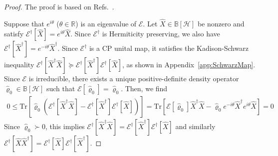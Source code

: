 \documentclass[preprint,pteplogo]{ptephy_v2}%
\numberwithin{equation}{section}
\theoremstyle{definition}
\newcommand{\mc}[1]{\mathcal{#1}}
\newcommand{\mr}[1]{\mathrm{#1}}
\newcommand{\mbb}[1]{\mathbb{#1}}
\newcommand{\Tr}{\mr{Tr}}
\begin{document}
\begin{proof}
The proof is based on Refs.~\cite{fagnola2009irreducible, wolf2012quantum}.

Suppose that $e^{i\theta}$ ($\theta \in \mbb{R}$) is an eigenvalue of $\mc{E}$.
Let $\hat{X} \in \mbb{B}[\mc{H}]$ be nonzero and satisfy $\mc{E}^\dagger[\hat{X}] = e^{i\theta} \hat{X}$. 
Since $\mc{E}^\dagger$ is Hermiticity preserving, we also have $\mc{E}^\dagger[\hat{X}^\dagger] = e^{-i\theta} \hat{X}^\dagger$.
Since $\mc{E}^\dagger$ is a CP unital map, it satisfies the Kadison-Schwarz inequality $\mc{E}^\dagger[\hat{X}^\dagger \hat{X}] \succeq \mc{E}^\dagger[\hat{X}^\dagger] \mc{E}^\dagger[\hat{X}]$, as shown in Appendix~\ref{app:SchwarzMap}.
Since $\mc{E}$ is irreducible, there exists a unique positive-definite density operator $\hat{\varrho}_0 \in \mbb{B}[\mc{H}]$ such that $\mc{E}[\hat{\varrho}_0] = \hat{\varrho}_0$.
Then, we find
\begin{align}
0 
\leq \Tr [\hat{\varrho}_0 (\mc{E}^\dagger[\hat{X}^\dagger \hat{X}] - \mc{E}^\dagger[\hat{X}^\dagger] \mc{E}^\dagger[\hat{X}])]
= \Tr [\mc{E}[\hat{\varrho}_0] \hat{X}^\dagger \hat{X} -\hat{\varrho}_0 e^{-i\theta} \hat{X}^\dagger e^{i\theta} \hat{X}]
= 0
\end{align}
Since $\hat{\varrho}_0 \succ 0$, this implies $\mc{E}^\dagger[\hat{X}^\dagger \hat{X}] = \mc{E}^\dagger[\hat{X}^\dagger] \mc{E}^\dagger[\hat{X}]$ and similarly $\mc{E}^\dagger[\hat{X} \hat{X}^\dagger] = \mc{E}^\dagger[\hat{X}] \mc{E}^\dagger[\hat{X}^\dagger]$.


\end{proof}
\end{document}
